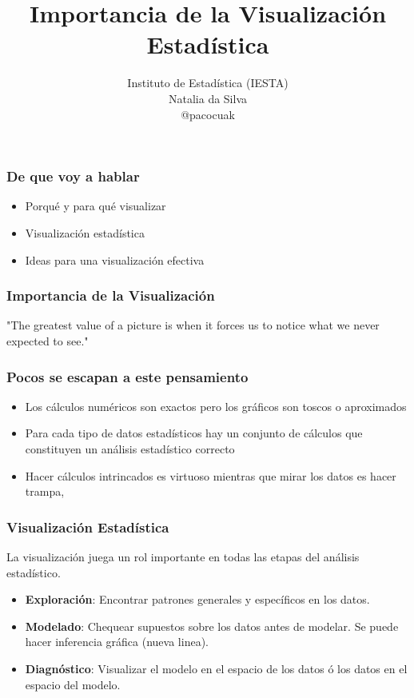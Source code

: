 \documentclass[9pt, spanish]{beamer}\usepackage[]{graphicx}\usepackage[]{color}
\author{Instituto de Estadística (IESTA)\\
Natalia da Silva\\
@pacocuak
}
\title{Importancia de la Visualizaci\'on Estad\'istica}
\begin{document}
 \frame{\titlepage}

\begin{frame}
\frametitle{De que voy a hablar}
\begin{itemize}
\item Porqu\'e y para qu\'e visualizar

\item Visualizaci\'on estad\'istica

\item Ideas para una visualizaci\'on efectiva

\end{itemize}
\end{frame}

\begin{frame}
\frametitle{Importancia de la Visualizaci\'on }

"The greatest value of a picture is when it forces us to notice what we never expected to see."   \cite{tukey77}

\vspace{1cm}


\end{frame}


\begin{frame}
\frametitle{Pocos se escapan a este pensamiento}

\begin{itemize}
\item Los c\'alculos num\'ericos son exactos pero los gr\'aficos son toscos o aproximados

\item Para cada tipo de datos estad\'isticos hay un conjunto de c\'alculos que constituyen un an\'alisis estad\'istico correcto

\item Hacer c\'alculos intrincados es virtuoso mientras que mirar los datos es hacer trampa, \cite{anscombe}

\end{itemize}

\end{frame}

\begin{frame}
\frametitle{Visualizaci\'on Estad\'istica}
La visualizaci\'on juega un rol importante en todas las etapas del an\'alisis estad\'istico.
\begin{itemize}
\item \textbf{Exploraci\'on}: Encontrar patrones generales y espec\'ificos en los datos. 
\item \textbf{Modelado}: Chequear supuestos sobre los datos antes de modelar.
Se puede hacer inferencia gr\'afica (nueva linea).
\item \textbf{Diagn\'ostico}: Visualizar el modelo en el espacio de los datos \'o los datos en el espacio del modelo.
\end{itemize}
\end{frame}
\end{document}

